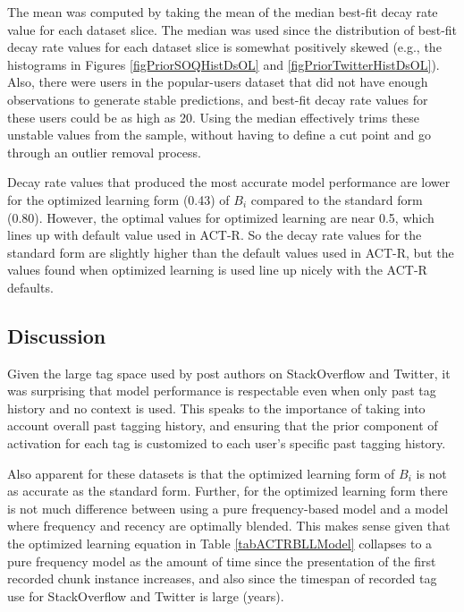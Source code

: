 \documentclass[man,floatsintext,donotrepeattitle]{apa6}
\begin{document}
The mean was computed by taking the mean of the median best-fit decay rate value for each dataset slice.
The median was used since the distribution of best-fit decay rate values for each dataset slice is somewhat positively skewed (e.g., the histograms in Figures \ref{figPriorSOQHistDsOL} and \ref{figPriorTwitterHistDsOL}).
Also, there were users in the popular-users dataset that did not have enough observations to generate stable predictions, and best-fit decay rate values for these users could be as high as 20.
Using the median effectively trims these unstable values from the sample, without having to define a cut point and go through an outlier removal process.

Decay rate values that produced the most accurate model performance are lower for the optimized learning form (0.43) of $B_{i}$ compared to the standard form (0.80).
However, the optimal values for optimized learning are near 0.5, which lines up with default value used in ACT-R.
So the decay rate values for the standard form are slightly higher than the default values used in ACT-R, but the values found when optimized learning is used line up nicely with the ACT-R defaults.

\subsection{Discussion}

Given the large tag space used by post authors on StackOverflow and Twitter, it was surprising that model performance is respectable even when only past tag history and no context is used.
This speaks to the importance of taking into account overall past tagging history, and ensuring that the prior component of activation for each tag is customized to each user's specific past tagging history.

Also apparent for these datasets is that the optimized learning form of $B_{i}$ is not as accurate as the standard form.
Further, for the optimized learning form there is not much difference between using a pure frequency-based model and a model where frequency and recency are optimally blended.
This makes sense given that the optimized learning equation in Table \ref{tabACTRBLLModel} collapses to a pure frequency model as the amount of time since the presentation of the first recorded chunk instance increases,
and also since the timespan of recorded tag use for StackOverflow and Twitter is large (years).
\end{document}
